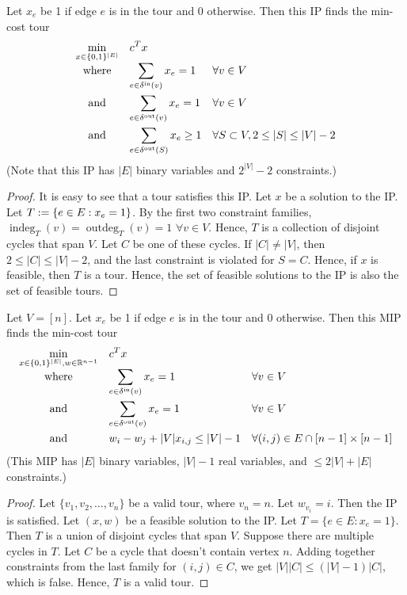 \documentclass[a4paper,12pt,fleqn]{article}
\newcommand*{\deltaIn}{\delta^{\mathrm{in}}}
\newcommand*{\deltaOut}{\delta^{\mathrm{out}}}
\DeclareMathOperator{\indeg}{indeg}
\DeclareMathOperator{\outdeg}{outdeg}
\newcommand*{\optprog}[3]{
\begin{array}{{>{\displaystyle}c}*2{>{\displaystyle}l}}
#1 & \multicolumn{2}{>{\displaystyle}l}{#2}
#3 \end{array}}
\begin{document}
\begin{lemma}
Let $x_e$ be 1 if edge $e$ is in the tour and 0 otherwise.
Then this IP finds the min-cost tour
\[ \optprog{\min_{x \in \{0, 1\}^{|E|}}}{c^Tx}{
\\ \textrm{where} & \sum_{e \in \deltaIn(v)} x_e = 1 & \forall v \in V
\\[1.5em] \textrm{and} & \sum_{e \in \deltaOut(v)} x_e = 1 & \forall v \in V
\\[1.5em] \textrm{and} & \sum_{e \in \deltaOut(S)} x_e \ge 1 & \forall S \subset V, 2 \le |S| \le |V|-2
} \]
(Note that this IP has $|E|$ binary variables and $2^{|V|}-2$ constraints.)
\end{lemma}
\begin{proof}
It is easy to see that a tour satisfies this IP.
Let $x$ be a solution to the IP. Let $T := \{e \in E: x_e = 1\}$.
By the first two constraint families, $\indeg_T(v) = \outdeg_T(v) = 1$ $\forall v \in V$.
Hence, $T$ is a collection of disjoint cycles that span $V$.
Let $C$ be one of these cycles. If $|C| \neq |V|$, then $2 \le |C| \le |V|-2$,
and the last constraint is violated for $S = C$.
Hence, if $x$ is feasible, then $T$ is a tour.
Hence, the set of feasible solutions to the IP is also the set of feasible tours.
\end{proof}

\begin{lemma}[MIP]
Let $V = [n]$. Let $x_e$ be 1 if edge $e$ is in the tour and 0 otherwise.
Then this MIP finds the min-cost tour
\[ \optprog{\min_{x \in \{0, 1\}^{|E|}, w \in \mathbb{R}^{n-1}}}{c^Tx}{
\\ \textrm{where} & \sum_{e \in \deltaIn(v)} x_e = 1 & \forall v \in V
\\[1.5em] \textrm{and} & \sum_{e \in \deltaOut(v)} x_e = 1 & \forall v \in V
\\[1.5em] \textrm{and} & w_i-w_j+|V|x_{i,j} \le |V|-1 & \forall (i,j) \in E \cap [n-1] \times [n-1]
} \]
(This MIP has $|E|$ binary variables, $|V|-1$ real variables, and $\le 2|V|+|E|$ constraints.)
\end{lemma}
\begin{proof}
Let $\{v_1, v_2, \ldots, v_n\}$ be a valid tour, where $v_n = n$.
Let $w_{v_i} = i$. Then the IP is satisfied.
Let $(x, w)$ be a feasible solution to the IP. Let $T = \{e \in E: x_e = 1\}$.
Then $T$ is a union of disjoint cycles that span $V$. Suppose there are multiple cycles in $T$.
Let $C$ be a cycle that doesn't contain vertex $n$.
Adding together constraints from the last family for $(i, j) \in C$,
we get $|V||C| \le (|V|-1)|C|$, which is false. Hence, $T$ is a valid tour.
\end{proof}
\end{document}
